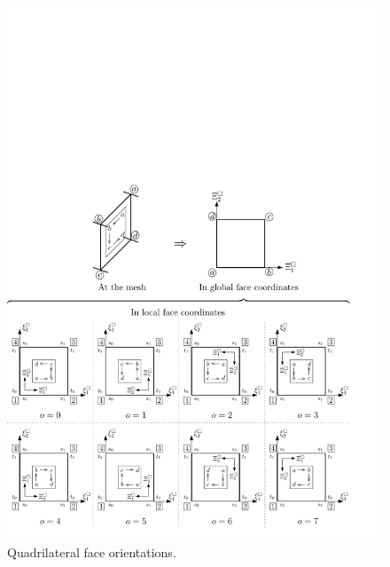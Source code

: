 \begin{figure}[!ht]
\begin{center}
\includegraphics[scale=0.75]{./figures/OrientationsQuad.pdf}
\caption{Quadrilateral face orientations.}
\label{fig:orientationsquad}
\end{center}
\end{figure}

